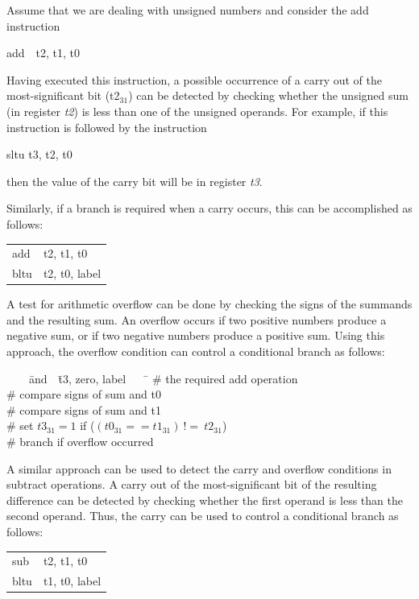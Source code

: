 \documentclass[11pt, twoside, pdftex]{article}
\newenvironment{ctabbing}%
{\begin{center}\begin{minipage}{\textwidth}\begin{tabbing}}
{\end{tabbing}\end{minipage}\end{center}}
\begin{document}
Assume that we are dealing with unsigned numbers and consider the {\sf add} instruction
\vspace{-\baselineskip}
\begin{center}
{\sf add~~t2, t1, t0}
\end{center}

Having executed this instruction, a possible occurrence of a carry out of the most-significant
bit (t2$_{31}$) can be detected by checking whether the unsigned sum (in register {\it t2}) 
is less than one of the unsigned operands. For example, if this instruction is followed by 
the instruction
\vspace{-\baselineskip}
\begin{center}
{\sf sltu} {\sf t3, t2, t0}
\end{center}

then the value of the carry bit will be in register {\it t3}.

\noindent
Similarly, if a branch is required when a carry occurs, this can be accomplished as follows:
\vspace{-\baselineskip}
\begin{center}
\begin{tabular}{ll}
{\sf add} & {\sf t2, t1, t0} \\
{\sf bltu} & {\sf t2, t0, label}
\end{tabular}
\end{center}

A test for arithmetic overflow can be done by checking the signs of the summands and the resulting
sum. An overflow occurs if two positive numbers produce a negative sum, or if two negative numbers
produce a positive sum. Using this approach, the overflow condition can control a conditional
branch as follows:
\vspace{-\baselineskip}
\begin{ctabbing}
~~~~\={\sf and}~~\={\sf t3, zero, label}~~~~\=\kill
{}  \>\# the required add operation\\
  \>\# compare signs of sum and t0 \\
  \>\# compare signs of sum and t1 \\
  \>\# set $\mathit{t3}_{31} = 1$ if ($(\mathit{t0}_{31} == \mathit{t1}_{31})~!=~\mathit{t2}_{31}$)\\
  \>\# branch if overflow occurred
\end{ctabbing}
\vspace{-\baselineskip}
A similar approach can be used to detect the carry and overflow conditions in subtract operations.
A carry out of the most-significant bit of the resulting difference can be detected by checking 
whether the first operand is less than the second operand. Thus, the carry can be used to control 
a conditional branch as follows:
\begin{center}
\begin{tabular}{ll}
{\sf sub} & {\sf t2, t1, t0} \\
{\sf bltu} & {\sf t1, t0, label}
\end{tabular}
\end{center}
\end{document}
